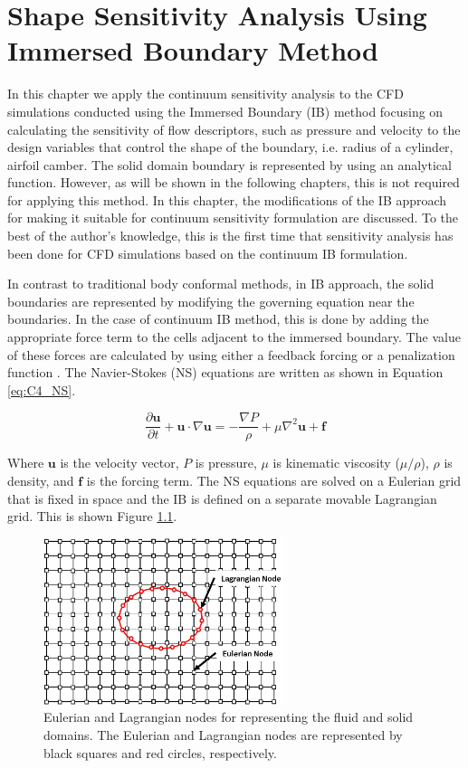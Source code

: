 \chapter{Shape Sensitivity Analysis Using Immersed Boundary Method}\label{ch:shapeSenwithIB}
In this chapter we apply the continuum sensitivity analysis to the CFD simulations conducted using the Immersed Boundary (IB) method focusing on calculating the sensitivity of flow descriptors, such as pressure and velocity to the design variables that control the shape of the boundary, i.e. radius of a cylinder, airfoil camber. The solid domain boundary is represented by using an analytical function. However, as will be shown in the following chapters, this is not required for applying this method. In this chapter, the modifications of the IB approach for making it suitable for continuum sensitivity formulation are discussed. To the best of the author's knowledge, this is the first time that sensitivity analysis has been done for CFD simulations based on the continuum IB formulation.

In contrast to traditional body conformal methods, in IB approach, the solid boundaries are represented by modifying the governing equation near the boundaries. In the case of continuum IB method, this is done by adding the appropriate force term to the cells adjacent to the immersed boundary. The value of these forces are calculated by using either a feedback forcing \cite{goldstein1993modeling} or a penalization function \cite{arquis1984conditions}. The Navier-Stokes (NS) equations are written as shown in Equation \eqref{eq:C4_NS}.

\begin{equation}\label{eq:C4_NS}
    \frac{\partial \mathbf{u}}{\partial t} + \mathbf{u} \cdot \nabla \mathbf{u} = 
    -\frac{\nabla P}{\rho} + \mu \nabla^2 \mathbf{u} + \mathbf{f}
\end{equation}

Where $\mathbf{u}$ is the velocity vector, $P$ is pressure, $\mu$ is kinematic viscosity ($\mu / \rho$), $\rho$ is density, and $\mathbf{f}$ is the forcing term. The NS equations are solved on a Eulerian grid that is fixed in space and the IB is defined on a separate movable Lagrangian grid. This is shown Figure \ref{fig:C4_lagrangianAndEulerianDomain}.

\begin{figure}[H]
    \centering
    \includegraphics[width=7.00cm]{Chapter_4/figure/lagrangian_and_eulerian_nodes.jpg}
    \caption{Eulerian and Lagrangian nodes for representing the fluid and solid domains. The Eulerian and Lagrangian nodes are represented by black squares and red circles, respectively.}
    \label{fig:C4_lagrangianAndEulerianDomain}
\end{figure}

